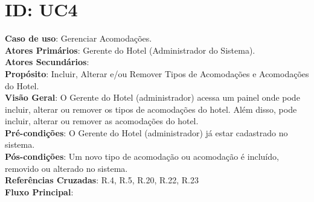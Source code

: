 \documentclass[notitlepage]{article}
\begin{document}
\clearpage

\section{ID: UC4}
\noindent\textbf{Caso de uso}: Gerenciar Acomodações.\\
\textbf{Atores Primários}: Gerente do Hotel (Administrador do Sistema). \\
\textbf{Atores Secundários}: \\
\textbf{Propósito}: Incluir, Alterar e/ou Remover Tipos de Acomodações e Acomodações do Hotel.\\
\textbf{Visão Geral}: O Gerente do Hotel (administrador) acessa um painel onde pode incluir, alterar ou remover os tipos de acomodações do hotel. Além disso, pode incluir, alterar ou remover as acomodações do hotel.\\
\textbf{Pré-condições}: O Gerente do Hotel (administrador) já estar cadastrado no sistema.\\
\textbf{Pós-condições}: Um novo tipo de acomodação ou acomodação é incluído, removido ou alterado no sistema.\\
\textbf{Referências Cruzadas}: R.4, R.5, R.20, R.22, R.23\\
\newline
\textbf{Fluxo Principal}:\\
\end{document}

